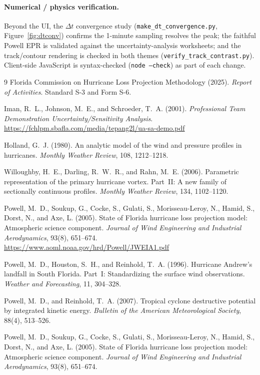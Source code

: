 \documentclass[11pt]{article}
\begin{document}
\paragraph{Numerical / physics verification.}
Beyond the UI, the $\Delta t$ convergence study (\texttt{make\_dt\_convergence.py},
Figure~\ref{fig:dtconv}) confirms the 1-minute sampling resolves the peak; the
faithful Powell EPR is validated against the uncertainty-analysis worksheets; and
the track/contour rendering is checked in both themes
(\texttt{verify\_track\_contrast.py}). Client-side JavaScript is syntax-checked
(\texttt{node --check}) as part of each change.

\begin{thebibliography}{9}
 Florida Commission on Hurricane Loss Projection Methodology (2025).
\emph{Report of Activities}. Standard S-3 and Form S-6.

 Iman, R.~L., Johnson, M.~E., and Schroeder, T.~A. (2001).
\emph{Professional Team Demonstration Uncertainty/Sensitivity Analysis}.
\url{https://fchlpm.sbafla.com/media/tepang2l/ua-sa-demo.pdf}

 Holland, G.~J. (1980). An analytic model of the wind and pressure
profiles in hurricanes. \emph{Monthly Weather Review}, 108, 1212--1218.

 Willoughby, H.~E., Darling, R.~W.~R., and Rahn, M.~E. (2006).
Parametric representation of the primary hurricane vortex. Part~II: A new family of
sectionally continuous profiles. \emph{Monthly Weather Review}, 134, 1102--1120.

 Powell, M.~D., Soukup, G., Cocke, S., Gulati, S.,
Morisseau-Leroy, N., Hamid, S., Dorst, N., and Axe, L. (2005). State of Florida
hurricane loss projection model: Atmospheric science component.
\emph{Journal of Wind Engineering and Industrial Aerodynamics}, 93(8), 651--674.
\url{https://www.aoml.noaa.gov/hrd/Powell/JWEIA1.pdf}

 Powell, M.~D., Houston, S.~H., and Reinhold, T.~A. (1996).
Hurricane Andrew's landfall in South Florida. Part~I: Standardizing the surface
wind observations. \emph{Weather and Forecasting}, 11, 304--328.

 Powell, M.~D., and Reinhold, T.~A. (2007).
Tropical cyclone destructive potential by integrated kinetic energy.
\emph{Bulletin of the American Meteorological Society}, 88(4), 513--526.

 Powell, M.~D., Soukup, G., Cocke, S., Gulati, S.,
Morisseau-Leroy, N., Hamid, S., Dorst, N., and Axe, L. (2005). State of Florida
hurricane loss projection model: Atmospheric science component.
\emph{Journal of Wind Engineering and Industrial Aerodynamics}, 93(8), 651--674.


\end{thebibliography}
\end{document}
